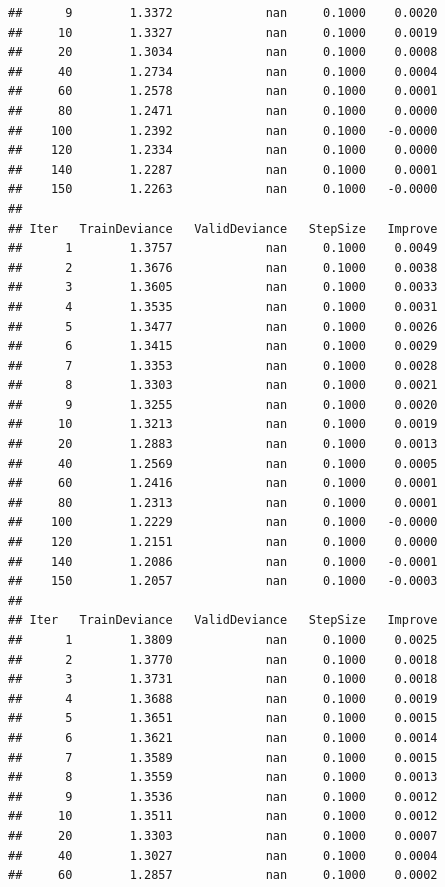 \documentclass[]{article}
\begin{document}
\begin{verbatim}
##      9        1.3372             nan     0.1000    0.0020
##     10        1.3327             nan     0.1000    0.0019
##     20        1.3034             nan     0.1000    0.0008
##     40        1.2734             nan     0.1000    0.0004
##     60        1.2578             nan     0.1000    0.0001
##     80        1.2471             nan     0.1000    0.0000
##    100        1.2392             nan     0.1000   -0.0000
##    120        1.2334             nan     0.1000    0.0000
##    140        1.2287             nan     0.1000    0.0001
##    150        1.2263             nan     0.1000   -0.0000
## 
## Iter   TrainDeviance   ValidDeviance   StepSize   Improve
##      1        1.3757             nan     0.1000    0.0049
##      2        1.3676             nan     0.1000    0.0038
##      3        1.3605             nan     0.1000    0.0033
##      4        1.3535             nan     0.1000    0.0031
##      5        1.3477             nan     0.1000    0.0026
##      6        1.3415             nan     0.1000    0.0029
##      7        1.3353             nan     0.1000    0.0028
##      8        1.3303             nan     0.1000    0.0021
##      9        1.3255             nan     0.1000    0.0020
##     10        1.3213             nan     0.1000    0.0019
##     20        1.2883             nan     0.1000    0.0013
##     40        1.2569             nan     0.1000    0.0005
##     60        1.2416             nan     0.1000    0.0001
##     80        1.2313             nan     0.1000    0.0001
##    100        1.2229             nan     0.1000   -0.0000
##    120        1.2151             nan     0.1000    0.0000
##    140        1.2086             nan     0.1000   -0.0001
##    150        1.2057             nan     0.1000   -0.0003
## 
## Iter   TrainDeviance   ValidDeviance   StepSize   Improve
##      1        1.3809             nan     0.1000    0.0025
##      2        1.3770             nan     0.1000    0.0018
##      3        1.3731             nan     0.1000    0.0018
##      4        1.3688             nan     0.1000    0.0019
##      5        1.3651             nan     0.1000    0.0015
##      6        1.3621             nan     0.1000    0.0014
##      7        1.3589             nan     0.1000    0.0015
##      8        1.3559             nan     0.1000    0.0013
##      9        1.3536             nan     0.1000    0.0012
##     10        1.3511             nan     0.1000    0.0012
##     20        1.3303             nan     0.1000    0.0007
##     40        1.3027             nan     0.1000    0.0004
##     60        1.2857             nan     0.1000    0.0002

\end{verbatim}
\end{document}
